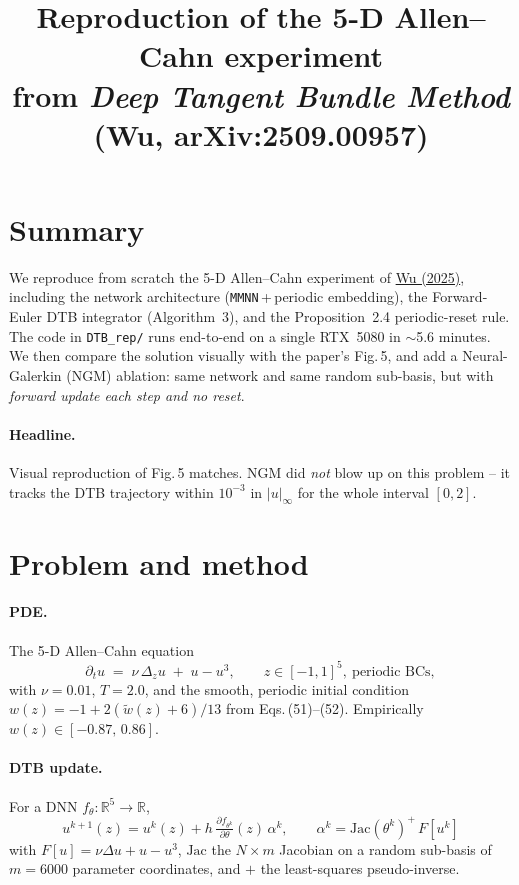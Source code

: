 \documentclass[11pt]{article}
\title{Reproduction of the 5-D Allen--Cahn experiment\\
       \large from \emph{Deep Tangent Bundle Method} (Wu, arXiv:2509.00957)}
\author{}
\date{}
\newcommand{\code}[1]{\texttt{\small #1}}
\begin{document}
\maketitle
\vspace{-3em}

\section*{Summary}

We reproduce from scratch the 5-D Allen--Cahn experiment of
\href{https://arxiv.org/abs/2509.00957}{Wu (2025)}, including the
network architecture (\code{MMNN}\,+\,periodic embedding), the
Forward-Euler DTB integrator (Algorithm~3), and the Proposition~2.4
periodic-reset rule. The code in \code{DTB\_rep/} runs end-to-end on a
single RTX~5080 in $\sim$5.6 minutes. We then compare the solution
visually with the paper's Fig.\,5, and add a Neural-Galerkin (NGM)
ablation: same network and same random sub-basis, but with
\emph{forward update each step and no reset}.

\paragraph{Headline.} Visual reproduction of Fig.\,5 matches.  NGM did
\emph{not} blow up on this problem -- it tracks the DTB trajectory
within $10^{-3}$ in $|u|_\infty$ for the whole interval $[0,2]$.

\section{Problem and method}

\paragraph{PDE.} The 5-D Allen--Cahn equation
\[
  \partial_t u \;=\; \nu\,\Delta_z u \;+\; u - u^3,
  \qquad z \in [-1,1]^5,\ \text{periodic BCs},
\]
with $\nu = 0.01$, $T = 2.0$, and the smooth, periodic initial
condition $w(z) = -1 + 2(\tilde{w}(z)+6)/13$ from Eqs.\,(51)--(52).
Empirically $w(z)\in[-0.87,\,0.86]$.

\paragraph{DTB update.} For a DNN $f_\theta:\mathbb{R}^5\to\mathbb{R}$,
\[
  u^{k+1}(z) = u^k(z) + h\,
              \tfrac{\partial f_{\theta^k}}{\partial \theta}(z)\,\alpha^k,
  \qquad
  \alpha^k = \mathrm{Jac}(\theta^k)^{+}\,F[u^k]
\]
with $F[u]=\nu\Delta u + u - u^3$, $\mathrm{Jac}$ the $N\times m$
Jacobian on a random sub-basis of $m=6000$ parameter coordinates, and
$+$ the least-squares pseudo-inverse.
\end{document}
